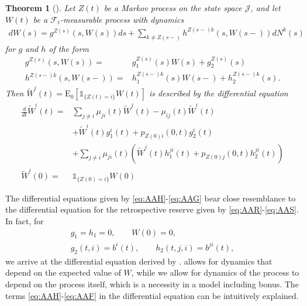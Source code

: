 \documentclass[12pt]{article}
\newcommand{\E}{\text{E}}
\newcommand{\indic}[1]{\mathds{1}_{ \{ #1 \} }}
\theoremstyle{my_thm}
\newtheorem{thm}{Theorem}[section]
\begin{document}
\begin{thm}[]
\label{thm:Diff_1}
Let $Z(t)$ be a Markov process on the state space $\mathcal{J}$, and let $W(t)$ be a $\mathcal{F}_t$-measurable process with dynamics
\begin{align*}
dW(s)=  g^{Z(s)}(s,W(s))ds+
 \sum_{k \neq Z(s-)} h^{Z(s-)k}(s,W(s-)) dN^k(s) 
\end{align*}
for $g$ and $h$ of the form
\begin{align*}
g^{Z(s)}(s,W(s))=&g^{Z(s)}_1(s) W(s)+g_2^{Z(s)}(s)
\\
h^{Z(s-)k}(s,W(s-))=&h_1^{Z(s-)k}(s) W(s-)+h_2^{Z(s-)k}(s).
\end{align*}
Then $\tilde{W}^i(t)=\E_0[\indic{Z(t)=i}W(t)]$ is described by the differential equation
\begin{align}
\frac{d}{dt}\tilde{W}^i(t)=&
\sum_{j \neq i} \mu_{ji}(t) \tilde{W}^j(t)-\mu_{ij}(t)\tilde{W}^i(t)
 \label{eq:AAH} \\
&+
\tilde{W}^i(t)g_1^i(t)+p_{Z(0)i}(0,t)g_2^i(t)
 \label{eq:AAI}\\
&+
\sum_{j\neq i} \mu_{ji}(t) \left( \tilde{W}^j(t) h_1^{ji}(t)+ p_{Z(0)j}(0,t)h_2^{ji}(t)\right) \label{eq:AAF}
\\
\tilde{W}^i(0)=&\indic{Z(0)=i}W(0) \label{eq:AAG}
\end{align}
\end{thm}
The differential equations given by \eqref{eq:AAH}-\eqref{eq:AAG} bear close resemblance to the differential equation for the retrospective reserve given by \eqref{eq:AAR}-\eqref{eq:AAS}. In fact, for
\begin{gather*}
g_1=h_1=0, \qquad W(0)=0,
\\
g_2(t,i)=b^{i}(t),\qquad h_2(t,j,i)=b^{ji}(t),
\end{gather*}
we arrive at the differential equation derived by \citet{Norberg}. \citet{Norberg} allows for dynamics that depend on the expected value of $W$, while we allow for dynamics of the process to depend on the process itself, which is a necessity in a model including bonus. The terms \eqref{eq:AAH}-\eqref{eq:AAF} in the differential equation can be intuitively explained.
\end{document}

